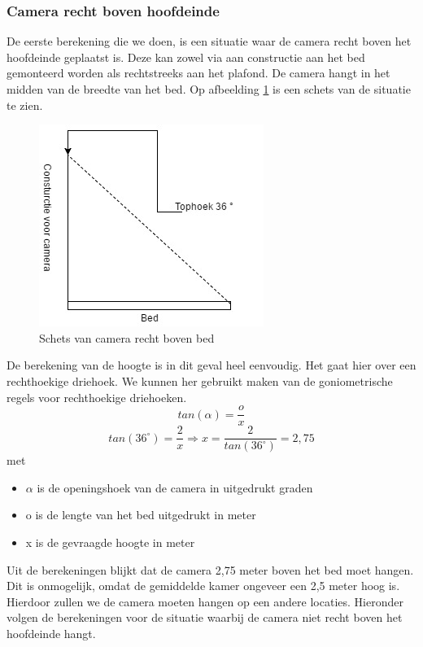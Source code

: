 \subsubsection{Camera recht boven hoofdeinde}
De eerste berekening die we doen, is een situatie waar de camera recht boven het hoofdeinde geplaatst is. Deze kan zowel via aan constructie aan het bed gemonteerd worden als rechtstreeks aan het plafond. De camera hangt in het midden van de breedte van het bed. Op afbeelding \ref{imgCBB} is een schets van de situatie te zien. 
\begin{figure}[hbp]
	\includegraphics[scale=0.7]{CamBovenBed}
	\caption{Schets van camera recht boven bed}
	\label{imgCBB}
\end{figure}
De berekening van de hoogte is in dit geval heel eenvoudig. Het gaat hier over een rechthoekige driehoek. We kunnen her gebruikt maken van de goniometrische regels voor rechthoekige driehoeken.
\begin{displaymath}
tan(\alpha) =\frac{o}{x}
\end{displaymath}
\begin{displaymath}
tan(36^\circ) = \frac{2}{x}
\Rightarrow x = \frac{2}{tan(36 ^\circ)} = 2,75
\end{displaymath}
met
\begin{itemize}
	\item $\alpha$ is de openingshoek van de camera in uitgedrukt graden
	\item o is de lengte van het bed uitgedrukt in meter
	\item x is de gevraagde hoogte in meter
\end{itemize}
Uit de berekeningen blijkt dat de camera 2,75 meter boven het bed moet hangen. Dit is onmogelijk, omdat de gemiddelde kamer ongeveer een 2,5 meter hoog is. Hierdoor zullen we de camera moeten hangen op een andere locaties. Hieronder volgen de berekeningen voor de situatie waarbij de camera niet recht boven het hoofdeinde hangt.

